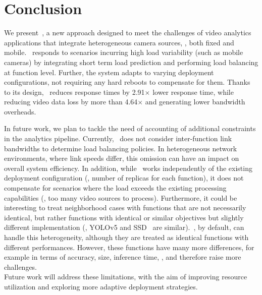 \section{Conclusion}\label{sec:conclusion}

We present~\videojam{}, a new approach designed to meet the challenges of video analytics applications that integrate heterogeneous camera sources, \ie, both fixed and mobile.~\videojam{} responds to scenarios incurring high load variability (such as mobile cameras) by integrating short term load prediction and performing load balancing at function level. Further, the system adapts to varying deployment configurations, not requiring any hard reboots to compensate for them. Thanks to its design,~\videojam{} reduces response times by 2.91$\times$ lower response time, while reducing video data loss by more than 4.64$\times$  and generating lower bandwidth overheads.

In future work, we plan to tackle the need of accounting of additional constraints in the analytics pipeline. Currently,~\videojam{} does not consider inter-function link bandwidths to determine load balancing policies. In heterogeneous network environments, where link speeds differ, this omission can have an impact on overall system efficiency. In addition, while~\videojam{} works independently of the existing deployment configuration (\eg, number of replicas for each function), it does not compensate for scenarios where the load exceeds the existing processing capabilities (\eg, too many video sources to process). Furthermore, it could be interesting to treat neighborhood cases with functions that are not necessarily identical, but rather functions with identical or similar objectives but slightly different implementation (\eg, YOLOv5 and SSD~\cite{liu2016ssd} are similar).~\videojam{}, by default, can handle this heterogeneity, although they are treated as identical functions with different performances. However, these functions have many more differences, for example in terms of accuracy, size, inference time, \etc, and therefore raise more challenges.\\
Future work will address these limitations, with the aim of improving resource utilization and exploring more adaptive deployment strategies.
